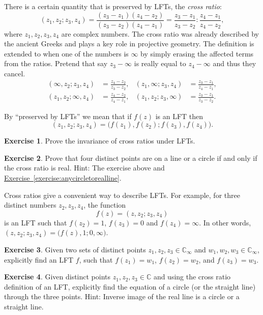 \documentclass[12pt,openany]{book}
\newcommand{\C}{{\mathbb{C}}}
\newcommand{\myindex}[1]{#1\index{#1}}
\theoremstyle{plain}
\theoremstyle{remark}
\theoremstyle{definition}
\newenvironment{exbox}{%
    \def\FrameCommand{\vrule width 1pt \relax\hspace {10pt}}%
    \MakeFramed {\advance \hsize -\width \FrameRestore }%
}{%
    \endMakeFramed
}
\theoremstyle{exercise}
\newtheorem{exercise}{Exercise}[section]
\theoremstyle{example}
\newcommand{\exerciseref}[1]{\hyperref[#1]{Exercise~\ref*{#1}}}
\begin{document}
There is a certain quantity that is preserved by LFTs, the
\emph{\myindex{cross ratio}}:
\begin{equation*}
(z_1,z_2;z_3,z_4)
=
\frac{(z_3-z_1)(z_4-z_2)}{(z_3-z_2)(z_4-z_1)}
=
\frac{z_3-z_1}{z_3-z_2} : 
\frac{z_4-z_1}{z_4-z_2} ,
\end{equation*}
where $z_1,z_2,z_3,z_4$ are complex numbers.  The cross ratio
was already described by the ancient Greeks and plays a key role in
projective geometry.
The definition is extended to when one of the numbers is $\infty$ by simply
erasing the affected terms from the ratios.  Pretend that say $z_3-\infty$
is really equal to $z_4-\infty$ and thus they cancel.
\begin{align*}
(\infty,z_2;z_3,z_4)
& =
\frac{z_4-z_2}{z_3-z_2}
,
&
(z_1,\infty;z_3,z_4)
& =
\frac{z_3-z_1}{z_4-z_1}
,
\\
(z_1,z_2;\infty,z_4)
& =
\frac{z_4-z_2}{z_4-z_1}
,
& 
(z_1,z_2;z_3,\infty)
& =
\frac{z_3-z_1}{z_3-z_2} .
\end{align*}

By ``preserved by LFTs'' we mean that if $f(z)$ is an LFT then
\begin{equation*}
(z_1,z_2;z_3,z_4) =
\bigl(f(z_1),f(z_2);f(z_3),f(z_4)\bigr) .
\end{equation*}

\begin{exbox}
\begin{exercise}
Prove the invariance of cross ratios under LFTs.
\end{exercise}

\begin{exercise}
Prove that four distinct points are on a line or a circle if and only if the cross
ratio is real.
Hint: The exercise above and \exerciseref{exercise:anycircletorealline}.
\end{exercise}
\end{exbox}

Cross ratios give a convenient way to describe LFTs.  For example, 
for three distinct numbers $z_2,z_3,z_4$, the
function
\begin{equation*}
f(z) =
(z,z_2;z_3,z_4)
\end{equation*}
is an LFT such that $f(z_2) = 1$, $f(z_3)=0$ and $f(z_4) = \infty$.
In other words,
$(z,z_2;z_3,z_4) = 
\bigl(f(z),1;0,\infty\bigr)$.

\begin{exbox}
\begin{exercise}
Given two sets of distinct points $z_1,z_2,z_3 \in \C_\infty$
and $w_1,w_2,w_3 \in \C_\infty$, explicitly find an LFT $f$,
such that
$f(z_1) = w_1$,
$f(z_2) = w_2$, and
$f(z_3) = w_3$.
\end{exercise}

\begin{exercise}
Given distinct points $z_1,z_2,z_3 \in \C$ and
using the cross ratio definition of an LFT, explicitly find
the equation of a circle (or the straight line) through the three points.
Hint: Inverse image of the real line is a circle or a straight line.
\end{exercise}
\end{exbox}
\end{document}
